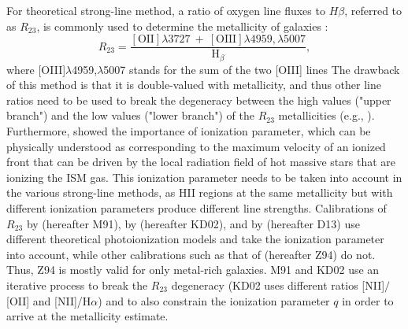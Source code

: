 \documentclass{emulateapj}
\newcommand{\ha}{H$\alpha$}
\begin{document}
For theoretical strong-line method, a ratio of oxygen line fluxes to $H\beta$, referred to as $R_{23}$, is commonly used to determine the metallicity of galaxies  \citep{pagel79}:
$$R_{23}=\frac{\mathrm{[OII]} \lambda 3727~+~\mathrm{[OIII]} \lambda 4959,\lambda 5007}{\mathrm{H}_\beta},$$ 
where [OIII]$\lambda$4959,$\lambda$5007 stands for the sum of the two [OIII] lines
 The drawback of this method is that it is double-valued with metallicity, and thus other line ratios need to be used to break the degeneracy between the high values ("upper branch") and the low values ("lower branch") of the $R_{23}$ metallicities (e.g., \citealt{kewley08}). 
Furthermore, \citet{kewley02} showed the importance of ionization parameter, which can be physically understood as corresponding to the maximum velocity of an ionized front that can be driven by the local radiation field of hot massive stars that are ionizing the ISM gas. This ionization parameter needs to be taken into account in the various strong-line methods, as HII regions at the same metallicity but with different ionization parameters produce different line strengths. Calibrations of $R_{23}$ by \citet{mcgaugh91} (hereafter M91), by \citet{kewley02} (hereafter KD02), and by \citet{dopita13} (hereafter D13) use different theoretical photoionization models and take the ionization parameter into account, while other calibrations such as that of \citet{zaritsky94} (hereafter Z94) do not. Thus, Z94 is mostly valid for only metal-rich galaxies.  M91 and KD02 use an iterative process to break the $R_{23}$ degeneracy  (KD02 uses different ratios [NII]$/$[OII] and [NII]/\ha) and to also constrain the ionization parameter $q$ in order to arrive at the metallicity estimate.
\end{document}
